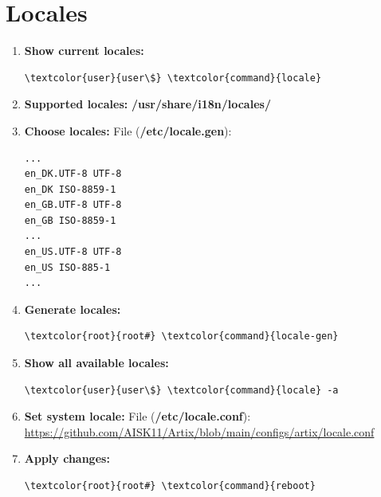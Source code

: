 \documentclass[10pt, a4paper, onecolumn, oneside, titlepage, openany]{book}
\begin{document}
\section{Locales}
\begin{enumerate}
    \item \textbf{Show current locales:}
\begin{Verbatim}[commandchars=\\\{\}]
\textcolor{user}{user\$} \textcolor{command}{locale}
\end{Verbatim}
    \item \textbf{Supported locales:}
\newline \textbf{\textcolor{dir}{/usr/share/i18n/locales/}}
    \item \textbf{Choose locales:}
\newline File (\textbf{\textcolor{file}{/etc/locale.gen}}):
\begin{Verbatim}[commandchars=\\\{\}]
...
en_DK.UTF-8 UTF-8
en_DK ISO-8859-1
en_GB.UTF-8 UTF-8
en_GB ISO-8859-1
...
en_US.UTF-8 UTF-8
en_US ISO-885-1
...
\end{Verbatim}
    \item \textbf{Generate locales:}
\begin{Verbatim}[commandchars=\\\{\}]
\textcolor{root}{root#} \textcolor{command}{locale-gen}
\end{Verbatim}
    \item \textbf{Show all available locales:}
\begin{Verbatim}[commandchars=\\\{\}]
\textcolor{user}{user\$} \textcolor{command}{locale} -a
\end{Verbatim}
    \item \textbf{Set system locale:}
\newline File (\textbf{\textcolor{file}{/etc/locale.conf}}):
\newline \url{https://github.com/AISK11/Artix/blob/main/configs/artix/locale.conf}
    \item \textbf{Apply changes:}
\begin{Verbatim}[commandchars=\\\{\}]
\textcolor{root}{root#} \textcolor{command}{reboot}
\end{Verbatim}
\end{enumerate}
\end{document}
